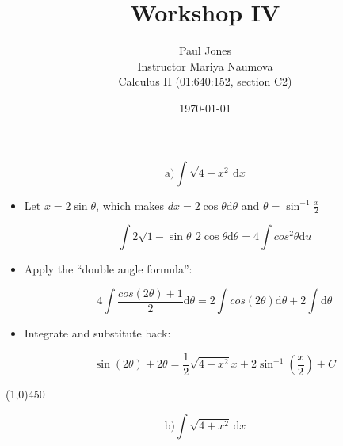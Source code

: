 \documentclass[11pt]{article}
\title{Workshop IV}
\author{Paul Jones \\
		Instructor Mariya Naumova\\
		Calculus II (01:640:152, section C2)}
\date{\today}
\begin{document}
\maketitle

\pagebreak

\begin{equation*} 
\mathrm{a)} \int \! \sqrt{4 - x^2} \, \mathrm{d}x
\end{equation*}

\begin {itemize}

\item Let $x = 2\sin\theta$, which makes $dx = 2\cos\theta\mathrm{d}\theta$ and $\theta = \sin^{-1}\frac{x}{2}$

\begin{equation*} 
\int \! 2\sqrt{1 - \sin\theta} \, 2\cos\theta\mathrm{d}\theta = 4\int \! cos^2\theta\mathrm{d}u
\end{equation*}

\item Apply the ``double angle formula'':

\begin{equation*}
4\int \! \frac{cos(2\theta) + 1}{2} \mathrm{d}\theta = 2\int cos(2\theta)\mathrm{d}\theta + 2\int \mathrm{d}\theta
\end{equation*}

\item Integrate and substitute back:

\begin{equation*}
\sin(2\theta) + 2\theta = \frac{1}{2}\sqrt{4 - x^2}x+2\sin^{-1}(\frac{x}{2}) + C
\end{equation*}

\end{itemize}

\begin{center}
\line(1,0){450}
\end{center}

\begin{equation*} 
\mathrm{b)} \int \! \sqrt{4 + x^2} \, \mathrm{d}x
\end{equation*}
\end{document}

